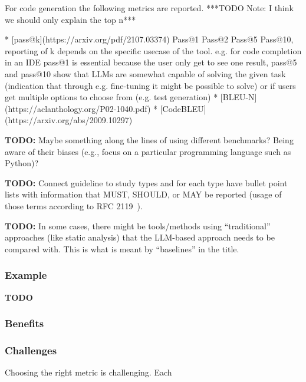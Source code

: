 \documentclass[11pt]{article}
\begin{document}
For code generation the following metrics are reported. ***TODO Note: I think we should only explain the top n***

* [pass@k](https://arxiv.org/pdf/2107.03374) Pass@1 Pass@2 Pass@5 Pass@10, reporting of k depends on the specific usecase of the tool. e.g. for code completion in an IDE pass@1 is essential because the user only get to see one result, pass@5 and pass@10 show that LLMs are somewhat capable of solving the given task (indication that through e.g. fine-tuning it might be possible to solve) or if users get multiple options to choose from (e.g. test generation)
* [BLEU-N](https://aclanthology.org/P02-1040.pdf)
* [CodeBLEU](https://arxiv.org/abs/2009.10297)

\textbf{TODO:} Maybe something along the lines of using different benchmarks? Being aware of their biases (e.g., focus on a particular programming language such as Python)?


\textbf{TODO:} Connect guideline to study types and for each type have bullet point lists with information that MUST, SHOULD, or MAY be reported (usage of those terms according to RFC 2119~\cite{rfc2119}).

\textbf{TODO:} In some cases, there might be tools/methods using ``traditional'' approaches (like static analysis) that the LLM-based approach needs to be compared with. This is what is meant by ``baselines'' in the title.

\subsubsection{Example}

\textbf{TODO}

\subsubsection{Benefits}


\subsubsection{Challenges}

Choosing the right metric is challenging.
Each
\end{document}
